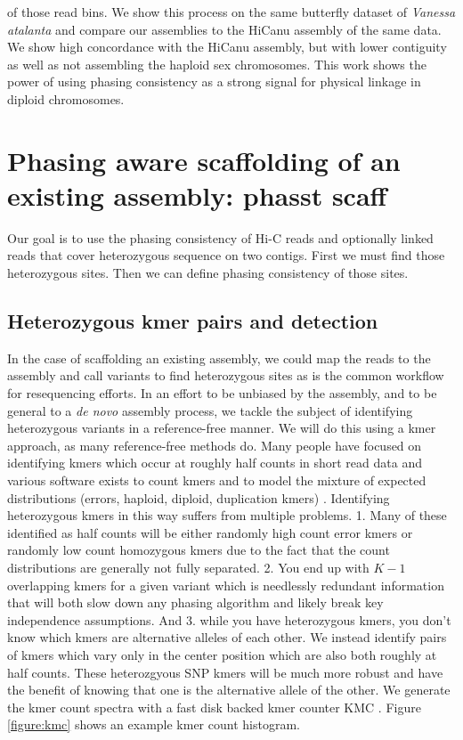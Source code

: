 {of those read bins. We show this process on the same butterfly dataset of \textit{Vanessa atalanta} and compare our assemblies to the HiCanu assembly of the same data. We show high concordance with the HiCanu assembly, but with lower contiguity as well as not assembling the haploid sex chromosomes. This work shows the power of using phasing consistency as a strong signal for physical linkage in diploid chromosomes.
}


\section{Phasing aware scaffolding of an existing assembly: phasst scaff}

\par{
Our goal is to use the phasing consistency of Hi-C reads and optionally linked reads that cover heterozygous sequence on two contigs. First we must find those heterozygous sites. Then we can define phasing consistency of those sites.
}

\subsection{Heterozygous kmer pairs and detection}
\par{
In the case of scaffolding an existing assembly, we could map the reads to the assembly and call variants to find heterozygous sites as is the common workflow for resequencing efforts. In an effort to be unbiased by the 
assembly, and to be general to a \textit{de novo} assembly process, we tackle the subject of identifying heterozygous variants in a reference-free manner. We will do this using a kmer approach, as many reference-free methods do. 
Many people have focused on identifying kmers which occur at roughly half counts in short read data \cite{KAT} and various software exists to count kmers \cite{jellyfish} 
and to model the mixture of expected distributions (errors, haploid, diploid, duplication kmers) \cite{genomescope}. Identifying heterozygous kmers in this way 
suffers from multiple problems. 1. Many of these identified as half counts will be either randomly high count error kmers or randomly low count 
homozygous kmers due to the fact that the count distributions are generally not fully separated. 2. You end up with $K-1$ overlapping kmers for a given variant which is needlessly redundant information that will both slow down any phasing algorithm and 
likely break key independence assumptions. And 3. while you have heterozygous kmers, you don't know which kmers are alternative alleles of each other. 
We instead identify pairs of kmers which vary only in the center position which are also both roughly at half counts. These heterozgyous SNP kmers 
will be much more robust and have the benefit of knowing that one is the alternative allele of the other. We generate the kmer count spectra with a fast disk backed kmer counter KMC \cite{kmc}\cite{kmc2}\cite{kmc3}. Figure \ref{figure:kmc} shows an example kmer count histogram. 
}

